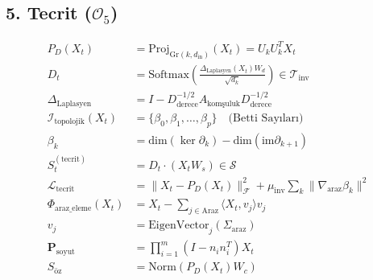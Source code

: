 \documentclass[11pt, a4paper]{article}
\begin{document}
\subsection{5. Tecrit ($\mathcal{O}_5$)}
\begin{align}
P_D(X_t) &= \text{Proj}_{\text{Gr}(k,d_{\text{in}})}\left( X_t \right) = U_k U_k^T X_t \\
D_t &= \text{Softmax}\left( \frac{\Delta_{\text{Laplasyen}}(X_t) W_d}{\sqrt{d_k}} \right) \in \mathcal{T}_{\text{inv}} \\
\Delta_{\text{Laplasyen}} &= I - D_{\text{derece}}^{-1/2} A_{\text{komşuluk}} D_{\text{derece}}^{-1/2} \\
\mathcal{I}_{\text{topolojik}}(X_t) &= \{ \beta_0, \beta_1, \dots, \beta_p \} \quad \text{(Betti Sayıları)} \\
\beta_k &= \text{dim}(\ker \partial_k) - \text{dim}(\text{im} \partial_{k+1}) \\
S_t^{(\text{tecrit})} &= D_t \cdot (X_t W_s) \in \mathcal{S} \\
\mathcal{L}_{\text{tecrit}} &= \| X_t - P_D(X_t) \|_{\mathcal{F}}^2 + \mu_{\text{inv}} \sum_k \|\nabla_{\text{araz}} \beta_k\|^2 \\
\Phi_{\text{araz\_eleme}}(X_t) &= X_t - \sum_{j \in \text{Araz}} \langle X_t, v_j \rangle v_j \\
v_j &= \text{EigenVector}_j(\Sigma_{\text{araz}}) \\
\mathbf{P}_{\text{soyut}} &= \prod_{i=1}^m (I - n_i n_i^T) X_t \\
S_{\text{öz}} &= \text{Norm}(P_D(X_t) W_c)
\end{align}
\end{document}
